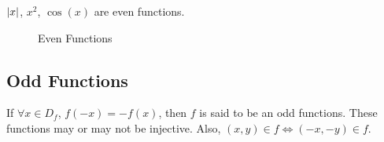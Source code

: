 \begin{example}
    \(\abs{x}\), \(x^2\), \(\cos(x)\) are even functions.
    \begin{figure}[H]
        \begin{subfigure}{.3\textwidth}
    \end{subfigure}%
    \begin{subfigure}{.3\textwidth}
    \end{subfigure}%
    \begin{subfigure}{.3\textwidth}
    \end{subfigure}%
    \caption{Even Functions}
    \end{figure}
\end{example}

\subsection{Odd Functions}

If \(\forall x \in D_{f}\), \(f(-x) = -f(x)\), then \(f\) is said to be an odd functions. These functions may
or may not be injective. Also, \(\left( x,y \right) \in f \iff \left( -x, -y \right) \in f\). 

